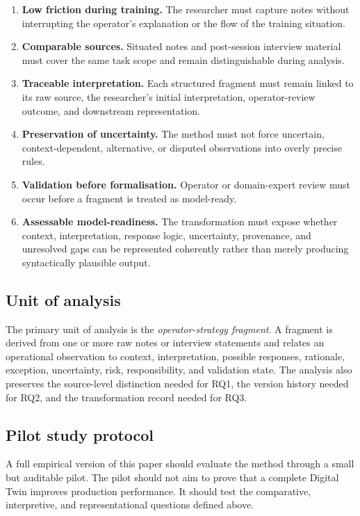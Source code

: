 \begin{enumerate}[label=R\arabic*.]
    \item \textbf{Low friction during training.} The researcher must capture notes without interrupting the operator's explanation or the flow of the training situation.
    \item \textbf{Comparable sources.} Situated notes and post-session interview material must cover the same task scope and remain distinguishable during analysis.
    \item \textbf{Traceable interpretation.} Each structured fragment must remain linked to its raw source, the researcher's initial interpretation, operator-review outcome, and downstream representation.
    \item \textbf{Preservation of uncertainty.} The method must not force uncertain, context-dependent, alternative, or disputed observations into overly precise rules.
    \item \textbf{Validation before formalisation.} Operator or domain-expert review must occur before a fragment is treated as model-ready.
    \item \textbf{Assessable model-readiness.} The transformation must expose whether context, interpretation, response logic, uncertainty, provenance, and unresolved gaps can be represented coherently rather than merely producing syntactically plausible output.
\end{enumerate}

\subsection{Unit of analysis}

The primary unit of analysis is the \emph{operator-strategy fragment}. A fragment is derived from one or more raw notes or interview statements and relates an operational observation to context, interpretation, possible responses, rationale, exception, uncertainty, risk, responsibility, and validation state. The analysis also preserves the source-level distinction needed for RQ1, the version history needed for RQ2, and the transformation record needed for RQ3.

\subsection{Pilot study protocol}

A full empirical version of this paper should evaluate the method through a small but auditable pilot. The pilot should not aim to prove that a complete Digital Twin improves production performance. It should test the comparative, interpretive, and representational questions defined above.

